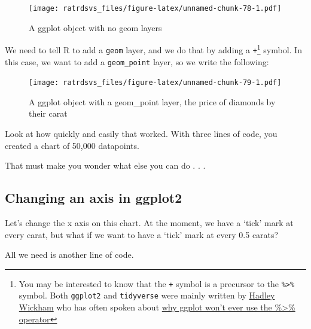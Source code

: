 \documentclass[
]{book}
\newenvironment{Shaded}{\begin{snugshade}}{\end{snugshade}}
\newcommand{\DataTypeTok}[1]{\textcolor[rgb]{0.13,0.29,0.53}{#1}}
\newcommand{\KeywordTok}[1]{\textcolor[rgb]{0.13,0.29,0.53}{\textbf{#1}}}
\newcommand{\NormalTok}[1]{#1}
\newcommand{\OperatorTok}[1]{\textcolor[rgb]{0.81,0.36,0.00}{\textbf{#1}}}
\newcommand{\StringTok}[1]{\textcolor[rgb]{0.31,0.60,0.02}{#1}}
\begin{document}
\begin{figure}
\centering
\texttt{[image: ratrdsvs\_files/figure-latex/unnamed-chunk-78-1.pdf]}
\caption{\label{fig:unnamed-chunk-78}A ggplot object with no geom layers}
\end{figure}

We need to tell R to add a \texttt{geom} layer, and we do that by adding a \texttt{+}\footnote{You may be interested to know that the \texttt{+} symbol is a precursor to the \texttt{\%\textgreater{}\%} symbol. Both \texttt{ggplot2} and \texttt{tidyverse} were mainly written by \href{https://twitter.com/hadleywickham}{Hadley Wickham} who has often spoken about \href{https://community.rstudio.com/t/why-cant-ggplot2-use/4372/7}{why ggplot won't ever use the \%\textgreater{}\% operator}} symbol. In this case, we want to add a \texttt{geom\_point} layer, so we write the following:

\begin{Shaded}
\end{Shaded}

\begin{figure}
\centering
\texttt{[image: ratrdsvs\_files/figure-latex/unnamed-chunk-79-1.pdf]}
\caption{\label{fig:unnamed-chunk-79}A ggplot object with a geom\_point layer, the price of diamonds by their carat}
\end{figure}

Look at how quickly and easily that worked. With three lines of code, you created a chart of 50,000 datapoints.

That must make you wonder what else you can do . . .

\hypertarget{gg_axis}{%
\subsection{Changing an axis in ggplot2}\label{gg_axis}}

Let's change the x axis on this chart. At the moment, we have a `tick' mark at every carat, but what if we want to have a `tick' mark at every 0.5 carats?

All we need is another line of code.
\end{document}
